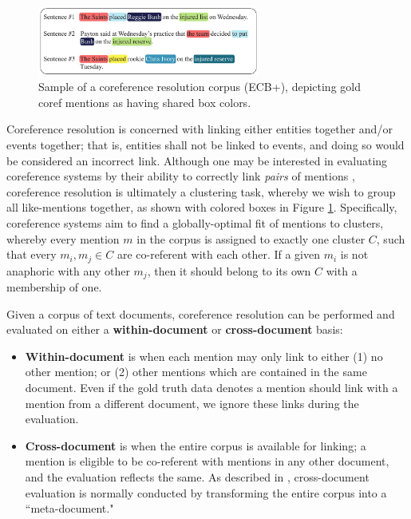 \begin{figure}[ht]
\centering
	\includegraphics[width=0.65\textwidth]{graphics/corpus}
	\caption{Sample of a coreference resolution corpus (ECB+), depicting gold coref mentions as having shared box colors.}
	\label{fig:corpus}
\end{figure}

Coreference resolution is concerned with linking either entities together and/or events together; that is, entities shall not be linked to events, and doing so would be considered an incorrect link.  Although one may be interested in evaluating coreference systems by their ability to correctly link \textit{pairs} of mentions \cite{parma}, coreference resolution is ultimately a clustering task, whereby we wish to group all like-mentions together, as shown with colored boxes in Figure \ref{fig:corpus}.  Specifically, coreference systems aim to find a globally-optimal fit of mentions to clusters, whereby every mention $m$ in the corpus is assigned to exactly one cluster $C$, such that every ${m_i,m_j} \in C$ are co-referent with each other.  If a given $m_i$ is not anaphoric with any other $m_j$, then it should belong to its own $C$ with a membership of one.

Given a corpus of text documents, coreference resolution can be performed and evaluated on either a \textbf{within-document} or \textbf{cross-document} basis:

\begin{itemize}
\item \textbf{Within-document} is when each mention may only link to either (1) no other mention; or (2) other mentions which are contained in the same document.  Even if the gold truth data denotes a mention should link with a mention from a different document, we ignore these links during the evaluation.
\item \textbf{Cross-document} is when the entire corpus is available for linking; a mention is eligible to be co-referent with mentions in any other document, and the evaluation reflects the same.  As described in \cite{revisit:16}, cross-document evaluation is normally conducted by transforming the entire corpus into a ``meta-document."
\end{itemize}

